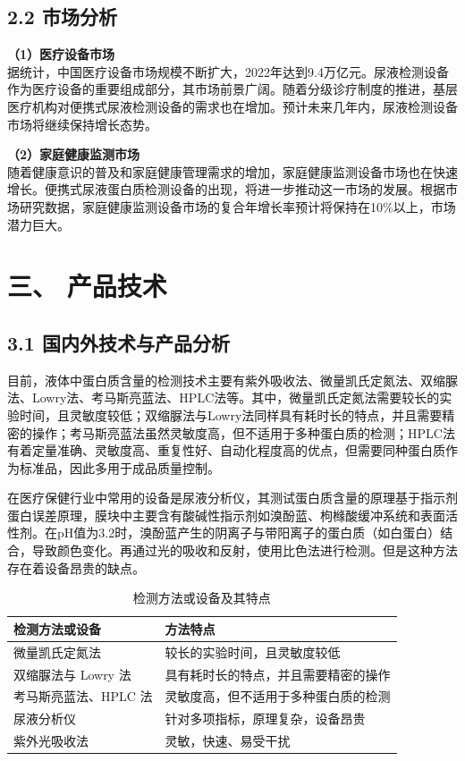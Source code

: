 \documentclass[a4paper,12pt]{article}
\begin{document}
\subsection*{2.2 市场分析}
\textbf{（1）医疗设备市场}\\
据统计，中国医疗设备市场规模不断扩大，2022年达到9.4万亿元。尿液检测设备作为医疗设备的重要组成部分，其市场前景广阔。随着分级诊疗制度的推进，基层医疗机构对便携式尿液检测设备的需求也在增加。预计未来几年内，尿液检测设备市场将继续保持增长态势。

\textbf{（2）家庭健康监测市场}\\
随着健康意识的普及和家庭健康管理需求的增加，家庭健康监测设备市场也在快速增长。便携式尿液蛋白质检测设备的出现，将进一步推动这一市场的发展。根据市场研究数据，家庭健康监测设备市场的复合年增长率预计将保持在10\%以上，市场潜力巨大。

\section*{三、 产品技术}
\subsection*{3.1 国内外技术与产品分析}
目前，液体中蛋白质含量的检测技术主要有紫外吸收法、微量凯氏定氮法、双缩脲法、Lowry法、考马斯亮蓝法、HPLC法等。其中，微量凯氏定氮法需要较长的实验时间，且灵敏度较低；双缩脲法与Lowry法同样具有耗时长的特点，并且需要精密的操作；考马斯亮蓝法虽然灵敏度高，但不适用于多种蛋白质的检测；HPLC法有着定量准确、灵敏度高、重复性好、自动化程度高的优点，但需要同种蛋白质作为标准品，因此多用于成品质量控制。

在医疗保健行业中常用的设备是尿液分析仪，其测试蛋白质含量的原理基于指示剂蛋白误差原理，膜块中主要含有酸碱性指示剂如溴酚蓝、枸橼酸缓冲系统和表面活性剂。在pH值为3.2时，溴酚蓝产生的阴离子与带阳离子的蛋白质（如白蛋白）结合，导致颜色变化。再通过光的吸收和反射，使用比色法进行检测。但是这种方法存在着设备昂贵的缺点。

\begin{table}[H]
    \centering
    \caption{检测方法或设备及其特点}
    \renewcommand{\arraystretch}{1.2}
    \begin{tabular}{|p{4cm}|p{10cm}|}
    \hline
    \textbf{检测方法或设备} & \textbf{方法特点} \\
    \hline
    微量凯氏定氮法 & 较长的实验时间，且灵敏度较低 \\
    \hline
    双缩脲法与 Lowry 法 & 具有耗时长的特点，并且需要精密的操作 \\
    \hline
    考马斯亮蓝法、HPLC 法 & 灵敏度高，但不适用于多种蛋白质的检测 \\
    \hline
    尿液分析仪 & 针对多项指标，原理复杂，设备昂贵 \\
    \hline
    紫外光吸收法 & 灵敏，快速、易受干扰 \\
    \hline
    \end{tabular}
\end{table}
\end{document}
